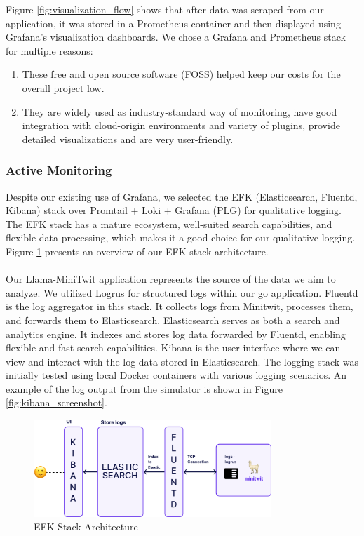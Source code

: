 \documentclass{article}
\begin{document}
Figure \ref{fig:visualization_flow} shows that after data was scraped from our application, it was stored in a Prometheus container and then displayed using Grafana's visualization dashboards. We chose a Grafana and Prometheus stack for multiple reasons:

\begin{enumerate}
    \item These free and open source software (FOSS) helped keep our costs for the overall project low.
    \item They are widely used as industry-standard way of monitoring, have good integration with cloud-origin environments and variety of plugins, provide detailed visualizations and are very user-friendly.
\end{enumerate}

\subsubsection{Active Monitoring}
Despite our existing use of Grafana, we selected the EFK (Elasticsearch, Fluentd, Kibana) stack over Promtail + Loki + Grafana (PLG) for qualitative logging. The EFK stack has a mature ecosystem, well-suited search capabilities, and flexible data processing, which makes it a good choice for our qualitative logging. Figure \ref{fig:efk_stack} presents an overview of our EFK stack architecture.
\\\\
Our Llama-MiniTwit application represents the source of the data we aim to analyze. We utilized Logrus for structured logs within our go application. Fluentd is the log aggregator in this stack. It collects logs from Minitwit, processes them, and forwards them to Elasticsearch. Elasticsearch serves as both a search and analytics engine. It indexes and stores log data forwarded by Fluentd, enabling flexible and fast search capabilities. Kibana is the user interface where we can view and interact with the log data stored in Elasticsearch. The logging stack was initially tested using local Docker containers with various logging scenarios. An example of the log output from the simulator is shown in Figure \ref{fig:kibana_screenshot}.
\begin{figure}[ht]
    \centering
    \includegraphics[width=0.8\textwidth]{./images/EFK_stack.png} 
    \caption{EFK Stack Architecture}
    \label{fig:efk_stack}
\end{figure}
\end{document}
